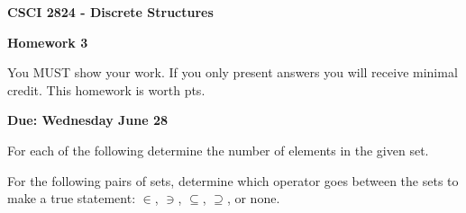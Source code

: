 \documentclass[addpoints]{exam}
\begin{document}
\singlespacing

\begin{center}
  {\large\textbf{CSCI 2824 - Discrete Structures}}

  {\large\textbf{Homework 3}}
\end{center}

You MUST show your work. If you only present answers you will receive minimal 
credit. This homework is worth \numpoints pts.

\textbf{Due: Wednesday June 28}

\begin{questions}
  \question[4] For each of the following determine the number of elements in the
  given set. 


  \question[5] For the following pairs of sets, determine which operator goes 
  between the sets to make a true statement: $\in$, $\ni$, $\subseteq$, 
  $\supseteq$, or none.

\end{questions}
\end{document}
